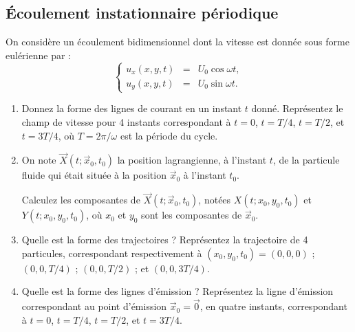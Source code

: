  





\subsection{\'Ecoulement instationnaire périodique}


On consid\`ere un \'ecoulement bidimensionnel dont la vitesse 
est donn\'ee sous forme eulérienne par :
\begin{equation*}
\left\{
\begin{array}{rcc}
u_x(x,y,t) & = & U_0 \cos \omega t, \\
u_y(x,y,t) & = & U_0 \sin \omega t. 
\end{array}
\right.
\end{equation*}

\begin{enumerate}

\item Donnez la forme des lignes de courant en un instant $t$ donné.
Représentez le champ de vitesse pour 4 instants correspondant 
à $t=0$, $t=T/4$, $t=T/2$, et $t=3T/4$, où 
$T = 2 \pi / \omega$ est la période du cycle.


\item On note $\vec X(t; \vec x_0, t_0)$ la position lagrangienne, à l'instant
$t$, de la particule fluide qui était située à la position $\vec x_0$  
à l'instant $t_0$. 

Calculez les composantes de $\vec X(t; \vec x_0, t_0)$,
notées  $X(t; x_0,y_0,t_0)$ et  $Y(t; x_0,y_0,t_0)$,
où $x_0$ et $y_0$ sont les composantes de $\vec x_0$.


\item Quelle est la forme des trajectoires ? Représentez la trajectoire
de 4 particules, correspondant respectivement à
$(x_0,y_0,t_0) = (0,0,0)$ ;  $(0,0,T/4)$ ; $(0,0,T/2)$ ; et $(0,0,3T/4)$.


\item Quelle est la forme des lignes d'émission ?
Représentez la ligne d'émission correspondant au 
point d'émission $\vec x_0 = \vec 0$, en quatre instants, 
correspondant à $t=0$, $t=T/4$, $t=T/2$, et $t=3T/4$. 

\end{enumerate}



